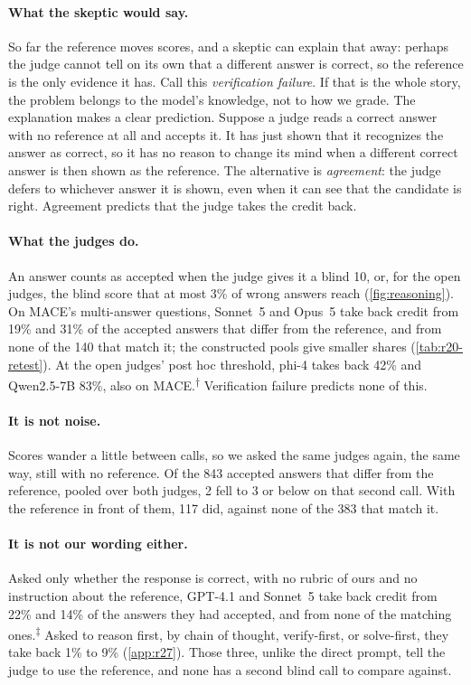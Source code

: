 \documentclass{article}
\newcommand{\reana}{\textsuperscript{$\ddagger$}}
\newcommand{\ph}{\textsuperscript{$\dagger$}}
\begin{document}
\paragraph{What the skeptic would say.}
So far the reference moves scores, and a skeptic can explain that away: perhaps the judge cannot tell on its own that a different answer is correct, so the reference is the only evidence it has. Call this \emph{verification failure}. If that is the whole story, the problem belongs to the model's knowledge, not to how we grade.
The explanation makes a clear prediction. Suppose a judge reads a correct answer with no reference at all and accepts it. It has just shown that it recognizes the answer as correct, so it has no reason to change its mind when a different correct answer is then shown as the reference.
The alternative is \emph{agreement}: the judge defers to whichever answer it is shown, even when it can see that the candidate is right. Agreement predicts that the judge takes the credit back.

\paragraph{What the judges do.}
An answer counts as accepted when the judge gives it a blind 10, or, for the open judges, the blind score that at most 3\% of wrong answers reach (\cref{fig:reasoning}).
On \textsc{MACE}'s multi-answer questions, Sonnet~5 and Opus~5 take back credit from 19\% and 31\% of the accepted answers that differ from the reference, and from none of the 140 that match it; the constructed pools give smaller shares (\cref{tab:r20-retest}). At the open judges' post hoc threshold, phi-4 takes back 42\% and Qwen2.5-7B 83\%, also on \textsc{MACE}.\ph{}
Verification failure predicts none of this.

\paragraph{It is not noise.}
Scores wander a little between calls, so we asked the same judges again, the same way, still with no reference.
Of the 843 accepted answers that differ from the reference, pooled over both judges, 2 fell to 3 or below on that second call. With the reference in front of them, 117 did, against none of the 383 that match it.

\paragraph{It is not our wording either.}
Asked only whether the response is correct, with no rubric of ours and no instruction about the reference, GPT-4.1 and Sonnet~5 take back credit from 22\% and 14\% of the answers they had accepted, and from none of the matching ones.\reana{}
Asked to reason first, by chain of thought, verify-first, or solve-first, they take back 1\% to 9\% (\cref{app:r27}). Those three, unlike the direct prompt, tell the judge to use the reference, and none has a second blind call to compare against.
\end{document}
